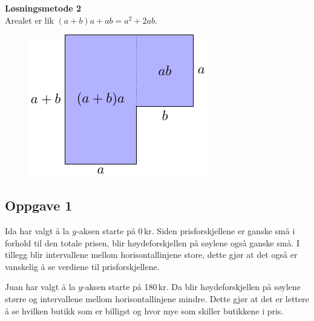 \textbf{Løsningsmetode 2}\\
Arealet er lik $ (a+b)a + ab = a^2+2ab$.
\begin{figure}
	\includegraphics[]{opg7d1_b}
\end{figure}

\newpage
\subsection*{Oppgave 1}
Ida har valgt å la $ y$-aksen starte på 0\,kr. Siden prisforskjellene er ganske små i forhold til den totale prisen, blir høydeforskjellen på søylene også ganske små. I tillegg blir intervallene mellom horisontallinjene store, dette gjør at det også er vanskelig å se verdiene til prisforskjellene.\vsk

Juan har valgt å la $ y $-aksen starte på 180\,kr. Da blir høydeforskjellen på søylene større og intervallene mellom horisontallinjene mindre. Dette gjør at det er lettere å se hvilken butikk som er billigst og hvor mye som skiller butikkene i pris.

